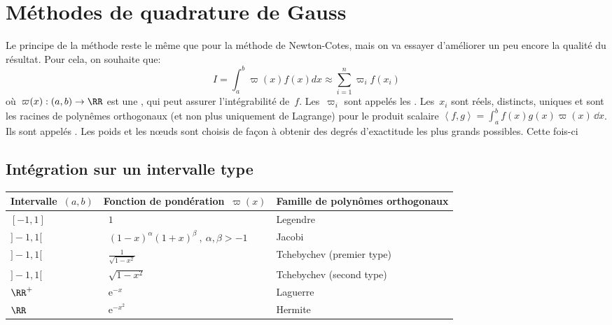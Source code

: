 \medskip
\section{Méthodes de quadrature de Gauss}

Le principe de la méthode reste le même que pour la méthode de Newton-Cotes, mais
on va essayer d'améliorer un peu encore la qualité du résultat.
Pour cela, on souhaite que:
\begin{equation}I=\int_a^b \varpi(x)f(x)dx \approx \sum_{i=1}^n \varpi_if(x_i)\end{equation}
où~$\varpi(x): (a,b)\rightarrow\RR$ est une , 
qui peut assurer l'intégrabilité de~$f$. 
Les~$\varpi_i$ sont appelés les .
Les~$x_i$ sont réels, distincts, uniques et sont les racines de polynêmes orthogonaux 
(et non plus uniquement de Lagrange) pour le produit scalaire 
$\left\langle f,g \right\rangle = \int_a^b f(x)g(x) \varpi(x) \,\dd x$. 
Ils sont appelés .
Les poids et les nœuds sont choisis de façon à obtenir des degrés d'exactitude les plus 
grands possibles.
Cette fois-ci 

\medskip
\subsection*{Intégration sur un intervalle type}


\begin{center}
\begin{tabular}{lll}
Intervalle~$(a,b)$ & Fonction de pondération~$\varpi(x)$ & Famille de polynômes orthogonaux\\
\hline
$[-1,1]$ &~$1$ & Legendre\\
$]-1,1[$ &~$(1-x)^\alpha (1+x)^\beta \ , \ \alpha, \beta > -1$ & Jacobi\\
$]-1,1[$ &~$\frac{1}{\sqrt{1-x^2}}$ &Tchebychev (premier type)\\
$]-1,1[$ &~$\sqrt{1-x^2}$ & Tchebychev (second type)\\
$\RR^+$ &~$\mathrm{e}^{-x}$ & Laguerre\\
$\RR$ &~$\mathrm{e}^{-x^2}$ & Hermite\\
\end{tabular}
\end{center}

